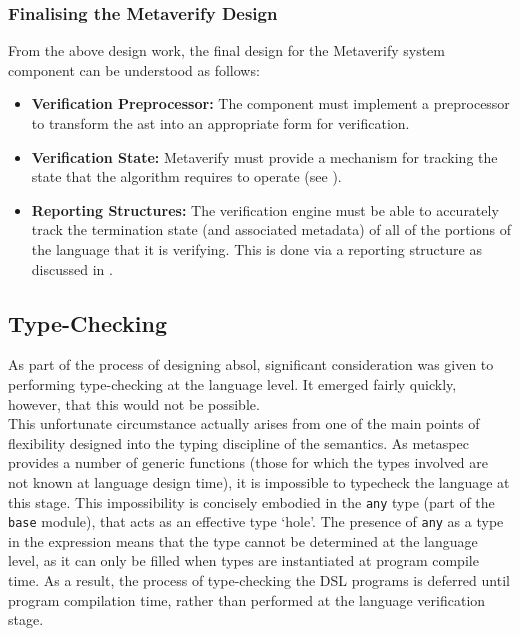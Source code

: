 
\subsubsection{Finalising the Metaverify Design} %
\label{ssub:finalising_the_metaverify_design}
From the above design work, the final design for the Metaverify system component can be understood as follows:
\begin{itemize}
    \item \textbf{Verification Preprocessor:} The component must implement a preprocessor to transform the \gls{ast} into an appropriate form for verification.
    \item \textbf{Verification State:} Metaverify must provide a mechanism for tracking the state that the algorithm requires to operate (see ).
    \item \textbf{Reporting Structures:} The verification engine must be able to accurately track the termination state (and associated metadata) of all of the portions of the language that it is verifying. 
    This is done via a reporting structure as discussed in .
\end{itemize}



\subsection{Type-Checking} %
\label{sub:type_checking}
As part of the process of designing \gls{absol}, significant consideration was given to performing type-checking at the language level. 
It emerged fairly quickly, however, that this would not be possible. \\

This unfortunate circumstance actually arises from one of the main points of flexibility designed into the typing discipline of the semantics. 
As \gls{metaspec} provides a number of generic functions (those for which the types involved are not known at language design time), it is impossible to typecheck the language at this stage.
This impossibility is concisely embodied in the \texttt{any} type (part of the \texttt{base} module), that acts as an effective type `hole'.
The presence of \texttt{any} as a type in the expression means that the type cannot be determined at the language level, as it can only be filled when types are instantiated at program compile time.
As a result, the process of type-checking the DSL programs is deferred until program compilation time, rather than performed at the language verification stage.\\

